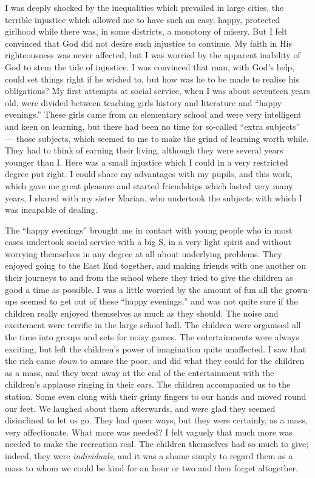 I was deeply shocked by the inequalities which
prevailed in large cities, the terrible injustice which
allowed me to have such an easy, happy, protected
girlhood while there was, in some districts, a monotony
of misery. But I felt convinced that God did not desire
such injustice to continue. My faith in His righteousness
was never affected, but I was worried by the apparent
inability of God to stem the tide of injustice. I was
convinced that man, with God’s help, could set things
right if he wished to, but how was he to be made to
realise his obligations? My first attempts at social
service, when I was about seventeen years old, were
divided between teaching girls history and literature
and “happy evenings.” These girls came from an
elementary school and were very intelligent and keen
on learning, but there had been no time for so-called
“extra subjects” — those subjects, which seemed to me
to make the grind of learning worth while. They had to
think of earning their living, although they were several
years younger than I. Here was a small injustice which
I could in a very restricted degree put right. I could
share my advantages with my pupils, and this work,
which gave me great pleasure and started friendships
which lasted very many years, I shared with my sister
Marian, who undertook the subjects with which I was
incapable of dealing.

The “happy evenings” brought me in contact with
young people who in most cases undertook social service
with a big S, in a very light spirit and without worrying
themselves in any degree at all about underlying
problems. They enjoyed going to the East End together,
and making friends with one another on their journeys
to and from the school where they tried to give the
children as good a time as possible. I was a little
worried by the amount of fun all the grown-ups seemed
to get out of these “happy evenings,” and was not quite
sure if the children really enjoyed themselves as much
as they should. The noise and excitement were terrific
in the large school hall. The children were organised all
the time into groups and sets for noisy games. The
entertainments were always exciting, but left the
children’s power of imagination quite unaffected. I
saw that the rich came \textsl{down} to amuse the poor, and did
what they could for the children as a mass, and they went
away at the end of the entertainment with the children's
applause ringing in their ears. The children accompanied
us to the station. Some even clung with their grimy
fingers to our hands and moved round our feet. We
laughed about them afterwards, and were glad they seemed
disinclined to let us go. They had queer ways, but they
were certainly, as a mass, very affectionate. What more
was needed? I felt vaguely that much more was needed
to make the recreation real. The children themselves
had so much to give; indeed, they were \textsl{individuals}, and
it was a shame simply to regard them as a mass to whom
we could be kind for an hour or two and then forget altogether.

